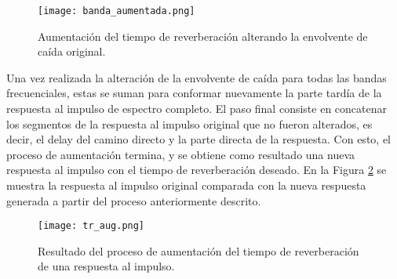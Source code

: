 \begin{figure}[H]
	\centering{}
	\texttt{[image: banda\_aumentada.png]}
	\caption{Aumentación del tiempo de reverberación alterando la envolvente de caída original.}
	\label{fig:banda_aumentada}
\end{figure}

Una vez realizada la alteración de la envolvente de caída para todas las bandas frecuenciales, estas se suman para conformar nuevamente la parte tardía de la respuesta al impulso de espectro completo. El paso final consiste en concatenar los segmentos de la respuesta al impulso original que no fueron alterados, es decir, el delay del camino directo y la parte directa de la respuesta. Con esto, el proceso de aumentación termina, y se obtiene como resultado una nueva respuesta al impulso con el tiempo de reverberación deseado. En la Figura \ref{fig:salida_aumentacion_tr} se muestra la respuesta al impulso original comparada con la nueva respuesta generada a partir del proceso anteriormente descrito. 

\begin{figure}[H]
	\centering{}
	\texttt{[image: tr\_aug.png]}
	\caption{Resultado del proceso de aumentación del tiempo de reverberación de una respuesta al impulso.}
	\label{fig:salida_aumentacion_tr}
\end{figure}







